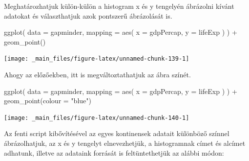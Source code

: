 \documentclass[
]{book}
\newenvironment{Shaded}{\begin{snugshade}}{\end{snugshade}}
\newcommand{\AttributeTok}[1]{\textcolor[rgb]{0.77,0.63,0.00}{#1}}
\newcommand{\FunctionTok}[1]{\textcolor[rgb]{0.00,0.00,0.00}{#1}}
\newcommand{\NormalTok}[1]{#1}
\newcommand{\SpecialCharTok}[1]{\textcolor[rgb]{0.00,0.00,0.00}{#1}}
\newcommand{\StringTok}[1]{\textcolor[rgb]{0.31,0.60,0.02}{#1}}
\begin{document}
Meghatározhatjuk külön-külön a histogram x és y tengelyén ábrázolni
kívánt adatokat és választhatjuk azok pontszerű ábrázolását is.

\begin{Shaded}
\begin{Highlighting}[]
\FunctionTok{ggplot}\NormalTok{(}
  \AttributeTok{data =}\NormalTok{ gapminder,}
  \AttributeTok{mapping =} \FunctionTok{aes}\NormalTok{(}
    \AttributeTok{x =}\NormalTok{ gdpPercap,}
    \AttributeTok{y =}\NormalTok{ lifeExp}
\NormalTok{  )}
\NormalTok{) }\SpecialCharTok{+}
  \FunctionTok{geom\_point}\NormalTok{()}
\end{Highlighting}
\end{Shaded}

\begin{center}\texttt{[image: \_main\_files/figure-latex/unnamed-chunk-139-1]} \end{center}

Ahogy az előzőekben, itt is megváltoztathatjuk az ábra színét.

\begin{Shaded}
\begin{Highlighting}[]
\FunctionTok{ggplot}\NormalTok{(}
  \AttributeTok{data =}\NormalTok{ gapminder,}
  \AttributeTok{mapping =} \FunctionTok{aes}\NormalTok{(}
    \AttributeTok{x =}\NormalTok{ gdpPercap,}
    \AttributeTok{y =}\NormalTok{ lifeExp}
\NormalTok{  )}
\NormalTok{) }\SpecialCharTok{+}
  \FunctionTok{geom\_point}\NormalTok{(}\AttributeTok{colour =} \StringTok{"blue"}\NormalTok{)}
\end{Highlighting}
\end{Shaded}

\begin{center}\texttt{[image: \_main\_files/figure-latex/unnamed-chunk-140-1]} \end{center}

Az fenti script kibővítésével az egyes kontinensek adatait különböző
színnel ábrázolhatjuk, az x és y tengelyt elnevezhetjük, a histogramnak
címet és alcímet adhatunk, illetve az adataink forrását is
feltüntethetjük az alábbi módon:

\begin{Shaded}
\end{Shaded}
\end{document}
